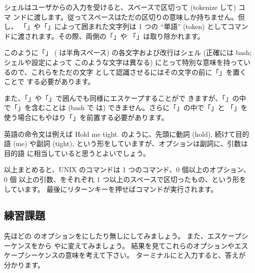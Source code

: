 \documentclass[platex]{jsarticle}
\begin{document}
 \begin{プチノート}
  シェルはユーザからの入力を受けると、スペースで区切って (tokenize して) コマ
  ンドに渡します。従ってスペースはただの区切りの意味しか持ちません。但し、
  「」や「」によって囲まれた文字列は 1 つの \mbox{``単語''}
  (token) としてコマンドに渡されます。その際、両側の「」や
  「」は取り除かれます。
  \vspace{1ex}

  このように「」%
  ({\vs} は半角スペース) の各文字および改行はシェル (正確には bash; シェルや設定によって
  このような文字は異なる) にとって特別な意味を持っているので、これらをただの文字
  として認識させるにはその文字の前に「\term{\bs}」を置くことで
  する必要があります。
  \vspace{1ex}

  また、「」や「」で囲んでも同様にエスケープすることがで
  きますが、「」の中で「」を含むことは (bash で
  は) できません。さらに「」の中で「」と
  「\term{\$}」を使う場合にもやはり「\term{\bs}」を前置する必要があります。
 \end{プチノート}

 英語の命令文は例えば Hold me tight. のように、先頭に動詞 (hold), 続けて目的語
 (me) や副詞 (tight), という形をしていますが、オプションは副詞に、引数は目的語
 に相当していると思うとよいでしょう。

 以上まとめると、UNIX のコマンドは 1 つのコマンド、0 個以上のオプション、0 個
 以上の引数、をそれぞれ 1 つ以上のスペースで区切ったもの、という形をしています。
 最後にリターンキーを押せばコマンドが実行されます。

  \subsection*{練習課題}
 先ほどの のオプションをにしたり無しにしてみましょう。
 また、エスケープシーケンスをから
 やに変えてみましょう。
 結果を見てこれらのオプションやエスケープシーケンスの意味を考えて下さい。
 ターミナルにと入力すると、答えが分かります。


%
\end{document}
